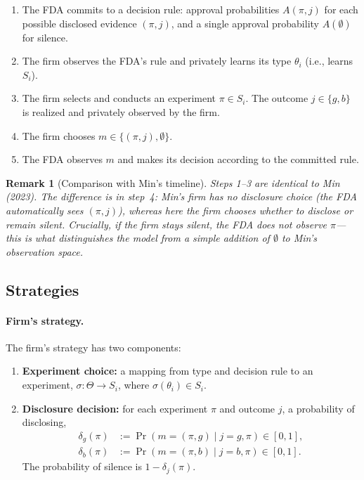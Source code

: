 \documentclass[12pt,a4paper]{article}
\newtheorem{remark}{Remark}
\begin{document}
\begin{enumerate}
  \item The FDA commits to a decision rule: approval
    probabilities $A(\pi, j)$ for each possible disclosed
    evidence $(\pi, j)$, and a single approval probability
    $A(\emptyset)$ for silence.
  \item The firm observes the FDA's rule and privately learns
    its type $\theta_i$ (i.e., learns $S_i$).
  \item The firm selects and conducts an experiment
    $\pi \in S_i$. The outcome $j \in \{g, b\}$ is realized
    and privately observed by the firm.
  \item The firm chooses $m \in \{(\pi, j), \emptyset\}$.
  \item The FDA observes $m$ and makes its decision according
    to the committed rule.
\end{enumerate}

\begin{remark}[Comparison with Min's timeline]
Steps 1--3 are identical to Min (2023). The difference is in
step~4: Min's firm has no disclosure choice (the FDA
automatically sees $(\pi, j)$), whereas here the firm chooses
whether to disclose or remain silent. Crucially, if the firm
stays silent, the FDA does not observe $\pi$---this is what
distinguishes the model from a simple addition of
$\emptyset$ to Min's observation space.
\end{remark}


\subsection{Strategies}
\label{sec:strategies}

\paragraph{Firm's strategy.}
The firm's strategy has two components:
\begin{enumerate}
  \item \textbf{Experiment choice:} a mapping from type and
    decision rule to an experiment,
    $\sigma: \Theta \to S_i$, where $\sigma(\theta_i) \in S_i$.
  \item \textbf{Disclosure decision:} for each experiment $\pi$
    and outcome $j$, a probability of disclosing,
    \begin{equation}\label{eq:delta}
    \begin{aligned}
      \delta_g(\pi) &:= \Pr(m = (\pi, g) \mid j = g, \pi)
        \in [0, 1], \\
      \delta_b(\pi) &:= \Pr(m = (\pi, b) \mid j = b, \pi)
        \in [0, 1].
    \end{aligned}
    \end{equation}
    The probability of silence is $1 - \delta_j(\pi)$.
\end{enumerate}
\end{document}
